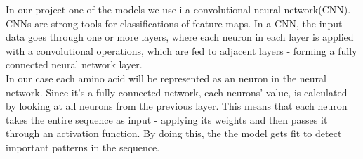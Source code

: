 In our project one of the models we use i a convolutional neural network(CNN). CNNs are strong tools for classifications of feature maps. In a CNN, the input data goes through one or more layers, where each neuron in each layer is applied with a convolutional operations, which are fed to adjacent layers - forming a fully connected neural network layer. \\

\noindent
In our case each amino acid will be represented as an neuron in the neural network. Since it's a fully connected network, each neurons' value, is calculated by looking at all neurons from the previous layer. This means that each neuron takes the entire sequence as input - applying its weights and then passes it through an activation function. By doing this, the the model gets fit to detect important patterns in the sequence.






